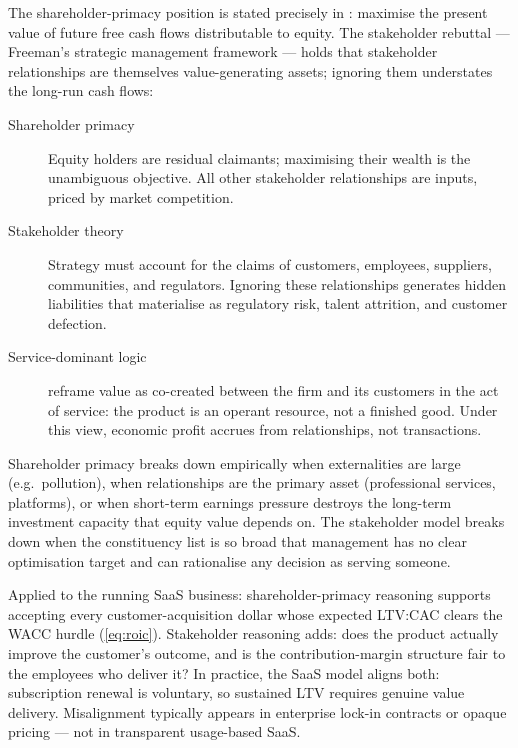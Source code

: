 The shareholder-primacy position is stated precisely in \textcite{ross2022}: maximise the present
value of future free cash flows distributable to equity. The stakeholder rebuttal --- Freeman's
strategic management framework --- holds that stakeholder relationships are themselves
value-generating assets; ignoring them understates the long-run cash flows:
\begin{description}
  \item[Shareholder primacy] Equity holders are residual claimants; maximising their wealth is
    the unambiguous objective. All other stakeholder relationships are inputs, priced by market
    competition. \parencite{brealey2020}
  \item[Stakeholder theory] Strategy must account for the claims of customers, employees,
    suppliers, communities, and regulators. Ignoring these relationships generates hidden
    liabilities that materialise as regulatory risk, talent attrition, and customer defection.
  \item[Service-dominant logic] \textcite{vargo2004service} reframe value as co-created between
    the firm and its customers in the act of service: the product is an operant resource, not a
    finished good. Under this view, economic profit accrues from relationships, not transactions.
\end{description}

Shareholder primacy breaks down empirically when externalities are large (e.g.\ pollution), when
relationships are the primary asset (professional services, platforms), or when short-term
earnings pressure destroys the long-term investment capacity that equity value depends on. The
stakeholder model breaks down when the constituency list is so broad that management has no
clear optimisation target and can rationalise any decision as serving someone.

\begin{example}
Applied to the running SaaS business: shareholder-primacy reasoning supports accepting every
customer-acquisition dollar whose expected LTV:CAC clears the WACC hurdle (\cref{eq:roic}).
Stakeholder reasoning adds: does the product actually improve the customer's outcome, and is
the contribution-margin structure fair to the employees who deliver it? In practice, the SaaS
model aligns both: subscription renewal is voluntary, so sustained LTV requires genuine value
delivery. Misalignment typically appears in enterprise lock-in contracts or opaque pricing ---
not in transparent usage-based SaaS.
\end{example}

